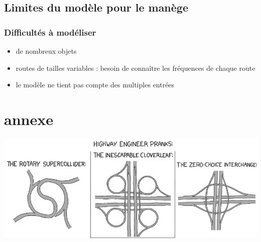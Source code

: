 \documentclass[slidetop,11pt]{beamer}
\begin{document}
	\subsection{Limites du modèle pour le manège}
	
\begin{frame}
	\frametitle{Difficultés à modéliser}
	\begin{itemize}
		\item de nombreux objets
		\item routes de tailles variables : besoin de connaître les fréquences de chaque route
		\item le modèle ne tient pas compte des multiples entrées
	\end{itemize}
\end{frame}

\section*{annexe}

\begin{frame}
	\includegraphics[scale=3]{./images/highway-engineers-pranks-hz}
\end{frame}
\end{document}
